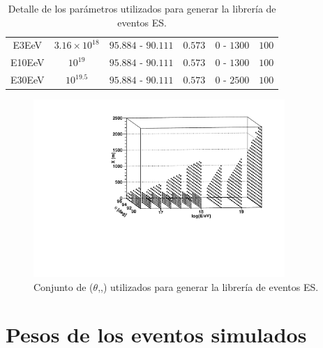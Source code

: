 \begin{table}
\begin{center}
\begin{tabular}{|c|c|cc|cc|}
				\multirow{2}{*}{E3EeV} & \multirow{2}{*}{$3.16\times10^{18}$} & \multirow{2}{*}{$95.884\text{ - }90.111$}  & \multirow{2}{*}{$0.573$} & \multirow{2}{*}{$0\text{ - }1300$} & \multirow{2}{*}{$100$}\\
				& & & & & \\
				
				\multirow{2}{*}{E10EeV} & \multirow{2}{*}{$10^{19}$} & \multirow{2}{*}{$95.884\text{ - }90.111$}  & \multirow{2}{*}{$0.573$} & \multirow{2}{*}{$0\text{ - }1300$} & \multirow{2}{*}{$100$} \\
				& & & & & \\
				
				\multirow{2}{*}{E30EeV} & \multirow{2}{*}{$10^{19.5}$} & \multirow{2}{*}{$95.884\text{ - }90.111$}  & \multirow{2}{*}{$0.573$} & \multirow{2}{*}{$0\text{ - }2500$} & \multirow{2}{*}{$100$} \\
				& & & & &\\
				\hline
				\end{tabular}
			\end{center}
			\caption{\label{tab:sim_table_es}
			Detalle de los parámetros utilizados para generar la librería de eventos ES.
			}
		\end{table}
		\begin{figure}[h!]
			\begin{center}
			\includegraphics[width=0.85\textwidth]{fig/simulacionAuger/3D_completeParameterSpace5}
			\caption{
			Conjunto de ($\theta$,\etau{},\xd{}) utilizados para generar la librería de eventos ES.
			}
			\label{fig:sim_fig_es}
			\end{center}
		\end{figure}
		
	\section{Pesos de los eventos simulados}
	\label{sc:pesos}
	
